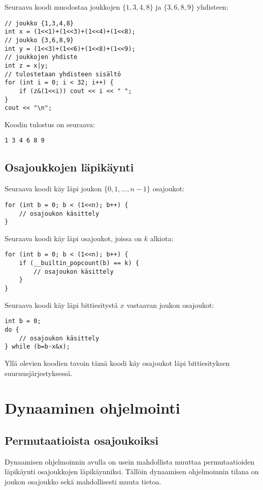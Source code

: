 \noindent
Seuraava koodi muodostaa
joukkojen $\{1,3,4,8\}$ ja $\{3,6,8,9\}$ yhdisteen:

\begin{lstlisting}
// joukko {1,3,4,8}
int x = (1<<1)+(1<<3)+(1<<4)+(1<<8);
// joukko {3,6,8,9}
int y = (1<<3)+(1<<6)+(1<<8)+(1<<9);
// joukkojen yhdiste
int z = x|y;
// tulostetaan yhdisteen sisältö
for (int i = 0; i < 32; i++) {
    if (z&(1<<i)) cout << i << " ";
}
cout << "\n";
\end{lstlisting}
Koodin tulostus on seuraava:
\begin{lstlisting}
1 3 4 6 8 9
\end{lstlisting}

\subsection{Osajoukkojen läpikäynti}

Seuraava koodi käy läpi joukon $\{0,1,\ldots,n-1\}$ osajoukot:

\begin{lstlisting}
for (int b = 0; b < (1<<n); b++) {
    // osajoukon käsittely
}
\end{lstlisting}

\noindent
Seuraava koodi käy läpi
osajoukot, joissa on $k$ alkiota:

\begin{lstlisting}
for (int b = 0; b < (1<<n); b++) {
    if (__builtin_popcount(b) == k) {
        // osajoukon käsittely
    }
}
\end{lstlisting}

\noindent
Seuraava koodi käy läpi bittiesitystä
$x$ vastaavan joukon osajoukot:
\begin{lstlisting}
int b = 0;
do {
    // osajoukon käsittely
} while (b=b-x&x);
\end{lstlisting}

Yllä olevien koodien tavoin tämä koodi käy osajoukot
läpi bittiesityksen suuruusjärjestyksessä.

\section{Dynaaminen ohjelmointi}

\subsection{Permutaatioista osajoukoiksi}

Dynaamisen ohjelmoinnin avulla on usein mahdollista
muuttaa permutaatioiden läpikäynti osajoukkojen läpikäynniksi.
Tällöin dynaamisen ohjelmoinnin tilana on
joukon osajoukko sekä mahdollisesti muuta tietoa.

